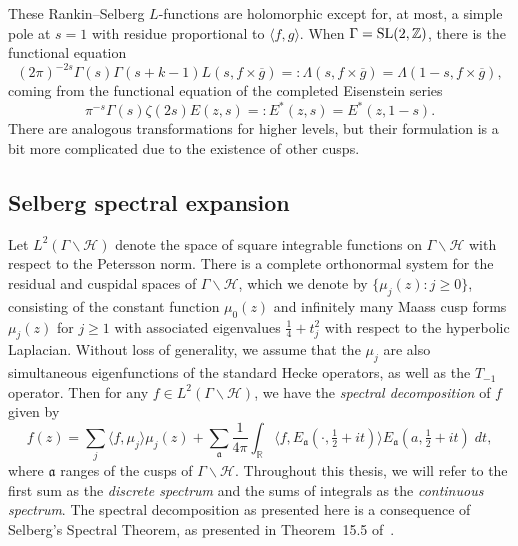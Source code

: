 These Rankin--Selberg $L$-functions are holomorphic except for, %
at most, a simple pole at $s = 1$ with residue proportional to $\langle f, g \rangle$.
When $\Gamma = \operatorname{SL}(2, \mathbb{Z})$, there is the functional equation
\begin{equation}
  (2\pi)^{-2s} \Gamma(s) \Gamma(s + k - 1) L(s, f\times \overline g) =: \Lambda(s, f\times
  \overline{g}) = \Lambda(1 - s, f\times \overline{g}),
\end{equation}
coming from the functional equation of the completed Eisenstein series
\begin{equation}
  \pi^{-s} \Gamma(s) \zeta(2s) E(z,s) =: E^*(z,s) = E^*(z, 1-s).
\end{equation}
There are analogous transformations for higher levels, but their formulation is a bit more
complicated due to the existence of other cusps.



\subsection{Selberg spectral expansion}\label{ssec:selberg-spectral}


Let $L^2(\Gamma \backslash \mathcal{H})$ denote the space of square integrable functions
on $\Gamma \backslash \mathcal{H}$ with respect to the Petersson norm.
There is a complete orthonormal system for the residual and cuspidal spaces of $\Gamma
\backslash \mathcal{H}$, which we denote by $\{\mu_j(z): j \geq 0\}$, consisting of the
constant function $\mu_0(z)$ and infinitely many Maass cusp forms $\mu_j(z)$ for $j \geq
1$ with associated eigenvalues $\tfrac{1}{4} + t_j^2$ with respect to the hyperbolic
Laplacian.
Without loss of generality, we assume that the $\mu_j$ are also simultaneous
eigenfunctions of the standard Hecke operators, as well as the $T_{-1}$ operator.
Then for any $f \in L^2(\Gamma \backslash \mathcal{H})$, we have the \emph{spectral
decomposition} of $f$ given by
\begin{equation}
  f(z) = \sum_j \langle f, \mu_j \rangle \mu_j(z) + \sum_{\mathfrak{a}} \frac{1}{4\pi}
  \int_\mathbb{R} \langle f, E_\mathfrak{a}(\cdot, \tfrac{1}{2} + it)\rangle
  E_\mathfrak{a}(a, \tfrac{1}{2} + it) \; dt,
\end{equation}
where $\mathfrak{a}$ ranges of the cusps of $\Gamma \backslash \mathcal{H}$.  Throughout
this thesis, we will refer to the first sum as the \emph{discrete spectrum} and the sums
of integrals as the \emph{continuous spectrum}.
The spectral decomposition as presented here is a consequence of Selberg's Spectral
Theorem, as presented in Theorem~15.5 of~\cite{IwaniecKowalski04}.


